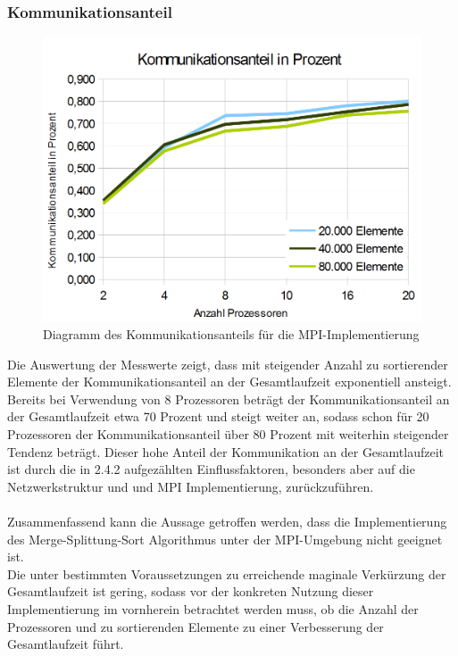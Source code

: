 \documentclass[a4paper,12pt]{scrartcl}
\begin{document}
\subsubsection{Kommunikationsanteil}
\begin{figure}[htb]
  \begin{center}
    \includegraphics[width=1\hsize]{../Kommunikationsanteil.PNG}
  \end{center}
  \caption{\label{mpikommoverhead}
    Diagramm des Kommunikationsanteils f\"ur die MPI-Implementierung}
\end{figure}
Die Auswertung der Messwerte zeigt, dass mit steigender Anzahl zu sortierender Elemente der Kommunikationsanteil an der Gesamtlaufzeit exponentiell ansteigt.
Bereits bei Verwendung von 8 Prozessoren betr\"agt der Kommunikationsanteil an der Gesamtlaufzeit etwa 70 Prozent und steigt weiter an, sodass schon
f\"ur 20 Prozessoren der Kommunikationsanteil \"uber 80 Prozent mit weiterhin steigender Tendenz betr\"agt.
Dieser hohe Anteil der Kommunikation an der Gesamtlaufzeit ist durch die in 2.4.2 aufgez\"ahlten Einflussfaktoren, besonders aber auf die Netzwerkstruktur und
und MPI Implementierung, zur\"uckzuf\"uhren.\\\\

Zusammenfassend kann die Aussage getroffen werden, dass die Implementierung des Merge-Splittung-Sort Algorithmus unter der MPI-Umgebung nicht geeignet ist.\\
Die unter bestimmten Voraussetzungen zu erreichende maginale Verk\"urzung der Gesamtlaufzeit ist gering, sodass vor der konkreten Nutzung dieser
Implementierung im vornherein betrachtet werden muss, ob die Anzahl der Prozessoren und zu sortierenden Elemente zu einer Verbesserung der Gesamtlaufzeit
f\"uhrt.
\end{document}
